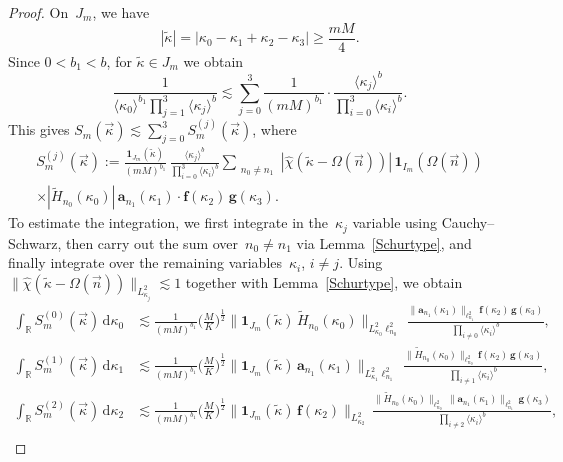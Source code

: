\documentclass[11pt,reqno,english]{amsart}
\numberwithin{equation}{section}
\theoremstyle{plain}
\theoremstyle{definition}
\theoremstyle{remark}
\newcommand{\la}{\langle}
\newcommand{\ra}{\rangle}
\begin{document}
\begin{proof}
	On~$J_m$, we have
	\[
	|\widetilde{\kappa}|=|\kappa_0-\kappa_1+\kappa_2-\kappa_3|\geq \frac{mM}{4}.
	\]
	Since $0<b_1<b$, for $\widetilde{\kappa}\in J_m$ we obtain
	\[
	\frac{1}{\la\kappa_0\ra^{b_1}\prod_{j=1}^3\la\kappa_j\ra^b}\lesssim \sum_{j=0}^3\frac{1}{(mM)^{b_1}}\cdot\frac{\la\kappa_j\ra^{b}}{\prod_{i=0}^3\la\kappa_i\ra^b}.
	\]
	This gives $S_m(\vec{\kappa})\lesssim \sum_{j=0}^3 S_m^{(j)}(\vec{\kappa})$, where
	\begin{multline*}
	S_m^{(j)}(\vec{\kappa}):=
	\frac{\mathbf{1}_{J_m}(\widetilde{\kappa})}{(mM)^{b_1}}\,\frac{\la\kappa_j\ra^b}{\prod_{i=0}^3\la\kappa_i\ra^b}\sum_{\substack{n_0\neq n_1}}|\widehat{\chi}(\widetilde{\kappa}-\Omega(\vec{n}))|\,\mathbf{1}_{I_m}(\Omega(\vec{n}))\\
	\times|\widetilde{H}_{n_0}(\kappa_0)|\,
	\mathbf{a}_{n_1}(\kappa_1)\cdot \mathbf{f}(\kappa_2)\,\mathbf{g}(\kappa_3).
\end{multline*}
	To estimate the integration, we first integrate in the~$\kappa_j$ variable using Cauchy--Schwarz, then carry out the sum over~$n_0\neq n_1$ via Lemma~\ref{Schurtype}, and finally integrate over the remaining variables~$\kappa_i$, $i\neq j$.
	Using $\|\widehat{\chi}(\widetilde{\kappa}-\Omega(\vec{n}))\|_{L_{\kappa_j}^2}\lesssim 1$ together with Lemma~\ref{Schurtype}, we obtain
	\begin{align*}
		\int_{\mathbb{R}}S_m^{(0)}(\vec{\kappa})\, \mathrm{d}\kappa_0 &\lesssim \frac{1}{(mM)^{b_1}}\Big(\frac{M}{K}\Big)^{\frac{1}{2}}
		\|\mathbf{1}_{J_m}(\widetilde{\kappa})\, \widetilde{H}_{n_0}(\kappa_0)\|_{L_{\kappa_0}^2\ell_{n_0}^2}\,\frac{\|\mathbf{a}_{n_1}(\kappa_1)\|_{\ell_{n_1}^2}\,
			\mathbf{f}(\kappa_2)\,\mathbf{g}(\kappa_3)
		}{\prod_{i\neq 0}\la\kappa_i\ra^b},\\
		\int_{\mathbb{R}}S_m^{(1)}(\vec{\kappa})\,\mathrm{d}\kappa_1 &\lesssim \frac{1}{(mM)^{b_1}}\Big(\frac{M}{K}\Big)^{\frac{1}{2}}
		\|\mathbf{1}_{J_m}(\widetilde{\kappa})\, \mathbf{a}_{n_1}(\kappa_1)\|_{L_{\kappa_1}^2\ell_{n_1}^2}\,\frac{\|\widetilde{H}_{n_0}(\kappa_0)\|_{\ell_{n_0}^2}\,
			\mathbf{f}(\kappa_2)\,\mathbf{g}(\kappa_3)
		}{\prod_{i\neq 1}\la\kappa_i\ra^b},\\
		\int_{\mathbb{R}}S_m^{(2)}(\vec{\kappa})\,\mathrm{d}\kappa_2 &\lesssim
		\frac{1}{(mM)^{b_1}}\Big(\frac{M}{K}\Big)^{\frac{1}{2}}\|\mathbf{1}_{J_m}(\widetilde{\kappa})\,\mathbf{f}(\kappa_2)\|_{L_{\kappa_2}^2}\,\frac{\|\widetilde{H}_{n_0}(\kappa_0)\|_{\ell_{n_0}^2}\,\|\mathbf{a}_{n_1}(\kappa_1)\|_{\ell_{n_1}^2}\,\mathbf{g}(\kappa_3)}{\prod_{i\neq 2}\la\kappa_i\ra^b},\\

\end{align*}
\end{proof}
\end{document}
